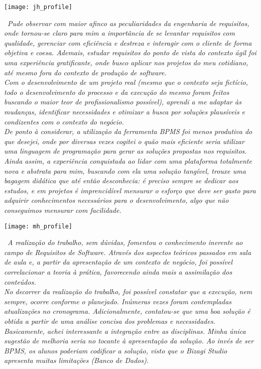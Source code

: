 \newpage
\vspace*{\fill}
\begin{center}
	\texttt{[image: jh\_profile]}
\end{center}
\vspace*{\fill}
\ \indent \emph{Pude observar com maior afinco as peculiaridades da engenharia de requisitos, onde tornou-se claro para mim a importância de se levantar requisitos com qualidade, gerenciar com eficiência e destreza e interagir com o cliente de forma objetiva e coesa. Ademais, estudar requisitos do ponto de vista do contexto ágil foi uma experiência gratificante, onde busco aplicar nos projetos do meu cotidiano, até mesmo fora do contexto de produção de software.}
\\ \indent \emph{Com o desenvolvimento de um projeto real (mesmo que o contexto seja fictício, todo o desenvolvimento do processo e da execução do mesmo foram feitos buscando o maior teor de profissionalismo possível), aprendi a me adaptar às mudanças, identificar necessidades e otimizar a busca por soluções plausíveis e condizentes com o contexto do negócio.}
\\ \indent \emph{De ponto à considerar, a utilização da ferramenta BPMS foi menos produtiva do que desejei, onde por diversas vezes cogitei o quão mais eficiente seria utilizar uma linguagem de programação para gerar as soluções propostas nos requisitos. Ainda assim, a experiência conquistada ao lidar com uma plataforma totalmente nova e abstrata para mim, buscando com ela uma solução tangível, trouxe uma bagagem didática que até então desconhecia: é preciso sempre se dedicar aos estudos, e em projetos é imprencidível mensurar o esforço que deve ser gasto para adquirir conhecimentos necessários para o desenvolvimento, algo que não conseguimos mensurar com facilidade.}

\newpage
\vspace*{\fill}
\begin{center}
	\texttt{[image: mh\_profile]}
\end{center}
\ \indent \emph{A realização do trabalho, sem dúvidas, fomentou o conhecimento inerente ao campo de Requisitos de Software. Através dos aspectos teóricos passados em sala de aula e, a partir da apresentação de um contexto de negócio, foi possível correlacionar a teoria à prática, favorecendo ainda mais a assimilação dos conteúdos.}
\\ \indent \emph{No decorrer da realização do trabalho, foi possível constatar que a execução, nem sempre, ocorre conforme o planejado. Inúmeras vezes foram contempladas atualizações no cronograma. Adicionalmente, contatou-se que uma boa solução é obtida a partir de uma análise concisa dos problemas e necessidades.}
\\ \indent \emph{Basicamente, achei interessante a integração entre as disciplinas. Minha única sugestão de melhoria seria no tocante à apresentação da solução. Ao invés de ser BPMS, os alunos poderiam codificar a solução, visto que o Bizagi Studio apresenta muitas limitações (Banco de Dados).}
\vspace*{\fill}

